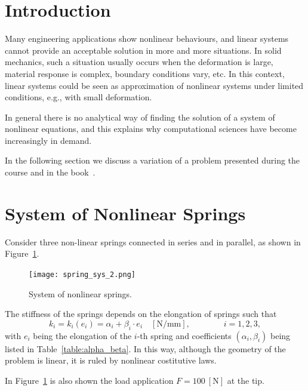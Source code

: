 
\section{Introduction}
\label{sec:introduction1}%

Many engineering applications show nonlinear behaviours, and linear systems cannot provide an acceptable solution in more and more situations. In solid mechanics, such a situation usually occurs when the deformation is large, material response is complex, boundary conditions vary, etc. In this context, linear systems could be seen as approximation of nonlinear systems under limited conditions, e.g., with small deformation.

In general there is no analytical way of finding the solution of a system of nonlinear equations, and this explains why computational sciences have become increasingly in demand.

In the following section we discuss a variation of a problem presented during the course and in the book~\cite{namhokim}.

\section{System of Nonlinear Springs}
\label{sec:system_NL_springs}%

Consider three non-linear springs connected in series and in parallel, as shown in Figure~\ref{fig:springs_first}.

\begin{figure}[H]
    \centering
    \texttt{[image: spring\_sys\_2.png]}
    \caption{System of nonlinear springs.}
    \label{fig:springs_first}
\end{figure}

The stiffness of the springs depends on the elongation of springs such that
\begin{equation*}
\label{eq:spring_1}
k_i = k_i\left( e_i \right) = \alpha_i+\beta_i\cdot e_i\quad [\text{N/mm}],\qquad\qquad i=1,2,3,
\end{equation*}
with $e_i$ being the elongation of the $i$-th spring and coefficients $\left( \alpha_i,\beta_i \right)$ being listed in Table~\ref{table:alpha_beta}. In this way, although the geometry of the problem is linear, it is ruled by nonlinear costitutive laws.

In Figure~\ref{fig:springs_first} is also shown the load application $F=100\ [\text{N}]$ at the tip.

